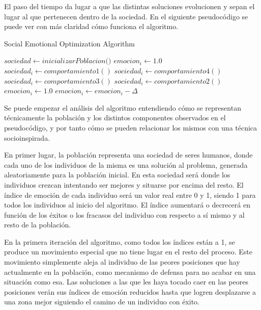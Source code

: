 El paso del tiempo da lugar a que las distintas soluciones evolucionen y sepan el lugar al que pertenecen dentro de la sociedad. En el siguiente pseudocódigo se puede ver con más claridad cómo funciona el algoritmo.

\begin{algorithm}
	\caption{Social Emotional Optimization Algorithm}
	\begin{algorithmic}[1]
		\State $sociedad \gets \textit{inicializarPoblacion()}$
		\State $emocion_i \gets 1.0$
		\State $sociedad_i \gets comportamiento\textit{1}()$
		\State $sociedad_i \gets comportamiento\textit{4}()$
		\State $sociedad_i \gets comportamiento\textit{3}()$
		\Else
		\State $sociedad_i \gets comportamiento\textit{2}()$
		\EndIf
		\State $emocion_i \gets 1.0$
		\Else
		\State $emocion_i \gets emocion_i - \Delta$
		\EndIf
		\EndWhile
	\end{algorithmic}
\end{algorithm}

Se puede empezar el análisis del algoritmo entendiendo cómo se representan técnicamente la población y los distintos componentes observados en el pseudocódigo, y por tanto cómo se pueden relacionar los mismos con una técnica socioinspirada.

En primer lugar, la población representa una sociedad de seres humanos, donde cada uno de los individuos de la misma es una solución al problema, generada aleatoriamente para la población inicial. En esta sociedad será donde los individuos crezcan intentando ser mejores y situarse por encima del resto. El índice de emoción de cada individuo será un valor real entre 0 y 1, siendo 1 para todos los individuos al inicio del algoritmo. El índice aumentará o decrecerá en función de los éxitos o los fracasos del individuo con respecto a sí mismo y al resto de la población.

En la primera iteración del algoritmo, como todos los índices están a 1, se produce un movimiento especial que no tiene lugar en el resto del proceso. Este movimiento simplemente aleja al individuo de las peores posiciones que hay actualmente en la población, como mecanismo de defensa para no acabar en una situación como esa. Las soluciones a las que les haya tocado caer en las peores posiciones verán sus índices de emoción reducidos hasta que logren desplazarse a una zona mejor siguiendo el camino de un individuo con éxito.

